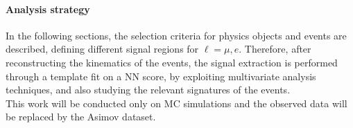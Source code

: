 \paragraph*{Analysis strategy}
In the following sections, the selection criteria for physics objects and events are described, defining different signal regions for $\ell=\mu,e$.
Therefore, after reconstructing the kinematics of the events, the signal extraction is performed through a template fit on a NN score, by exploiting multivariate analysis techniques, and also studying the relevant signatures of the events.\\
This work will be conducted only on MC simulations and the observed data will be replaced by the Asimov dataset.



